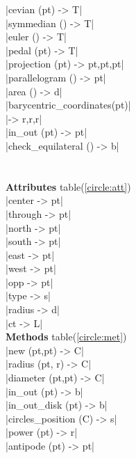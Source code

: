 \documentclass[DIV         = 14,
               fontsize    = 10,
               index       = totoc,
               twoside,
               cadre,
               headings    = small
               ]{tkz-doc}
\begin{document}
\begin{multicols}{3}
|cevian (pt)               -> T|   \\
|symmedian ()              -> T|   \\
|euler ()                  -> T|   \\
|pedal (pt)                -> T|   \\
|projection (pt)     -> pt,pt,pt|  \\
|parallelogram ()          -> pt|  \\
|area ()                   -> d|   \\
|barycentric_coordinates(pt)|      \\
                      |-> r,r,r|   \\
|in_out (pt)               -> pt|  \\
|check_equilateral ()      -> b|   \\
                                   \\
             \\
\textbf{Attributes} table(\ref{circle:att}) \\
|center                    -> pt|  \\
|through                   -> pt|  \\
|north                     -> pt|  \\
|south                     -> pt|  \\
|east                      -> pt|  \\
|west                      -> pt|  \\
|opp                       -> pt|  \\
|type                      -> s|   \\
|radius                    -> d|   \\
|ct                        -> L|   \\ 
\textbf{Methods} table(\ref{circle:met})  \\
|new (pt,pt)               -> C|   \\
|radius (pt, r)            -> C|   \\
|diameter (pt,pt)          -> C|   \\       
|in_out (pt)               -> b|   \\     
|in_out_disk (pt)          -> b|   \\     
|circles_position (C)      -> s|   \\     
|power (pt)                -> r|   \\     
|antipode (pt)             -> pt|  \\     

\end{multicols}
\end{document}
